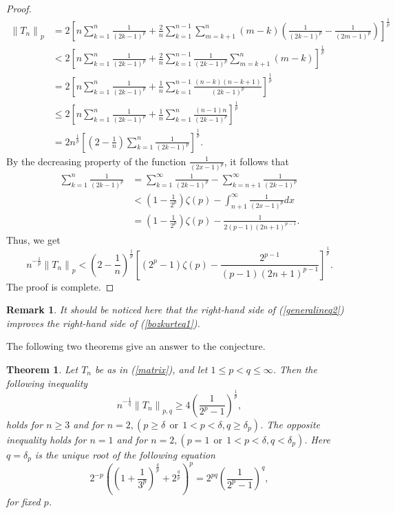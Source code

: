 \documentclass{amsart}
\newtheorem{theorem}{Theorem}
\newtheorem{remark}{Remark}
\begin{document}
\begin{proof}
\begin{align*}
\left\|T_n\right\|_p&=2\left[n\sum_{k=1}^n\frac{1}{(2k-1)^p}+\frac{2}{n}\sum_{k=1}^{n-1}\sum_{m=k+1}^{n}(m-k)\left(\frac{1}{(2k-1)^p}-\frac{1}{(2m-1)^p}\right)\right]^\frac{1}{p}\\
&< 2\left[n\sum_{k=1}^n\frac{1}{(2k-1)^p}+\frac{2}{n}\sum_{k=1}^{n-1}\frac{1}{(2k-1)^p}\sum_{m=k+1}^{n}(m-k)\right]^\frac{1}{p}\\
&= 2\left[n\sum_{k=1}^n\frac{1}{(2k-1)^p}+\frac{1}{n}\sum_{k=1}^{n-1}\frac{(n-k)(n-k+1)}{(2k-1)^p}\right]^\frac{1}{p}\\
&\leq 2\left[n\sum_{k=1}^n\frac{1}{(2k-1)^p}+\frac{1}{n}\sum_{k=1}^{n}\frac{(n-1)n}{(2k-1)^p}\right]^\frac{1}{p}\\
&= 2n^\frac{1}{p}\left[\left(2-\frac{1}{n}\right)\sum_{k=1}^n\frac{1}{(2k-1)^p}\right]^\frac{1}{p}.
\end{align*}
By the decreasing property of the function $\frac{1}{(2x-1)^p}$, it follows that
\begin{align*}
    \sum_{k=1}^n\frac{1}{(2k-1)^p}&=\sum_{k=1}^\infty\frac{1}{(2k-1)^p}-\sum_{k=n+1}^\infty\frac{1}{(2k-1)^p}\\
    &<\left(1-\frac{1}{2^p}\right)\zeta(p)-\int_{n+1}^\infty\frac{1}{(2x-1)^p}dx\\
    &=\left(1-\frac{1}{2^p}\right)\zeta(p)-\frac{1}{2(p-1)(2n+1)^{p-1}}.
\end{align*}
Thus, we get
$$n^{-\frac{1}{p}}\left\|T_n\right\|_p<\left(2-\frac{1}{n}\right)^{\frac{1}{p}}\left[(2^p-1)\zeta(p)-\frac{2^{p-1}}{(p-1)(2n+1)^{p-1}}\right]^\frac{1}{p}.$$
The proof is complete.
\end{proof}
\begin{remark}
It should be noticed here that the right-hand side of (\ref{generalineq2}) improves the right-hand side of (\ref{bozkurteq1}).
\end{remark}
The following two theorems give an answer to the conjecture.
\begin{theorem}\label{mainthm1}
Let $T_n$ be as in (\ref{matrix}), and let $1\leq p<q\leq\infty$. Then the following inequality
\begin{equation}\label{mainthmeq1}
n^{-\frac{1}{q}}\left\|T_{n}\right\|_{p,q}\geq 4\left(\frac{1}{2^{p}-1}\right)^{\frac{1}{p}}, 
\end{equation}
holds for $n\geq3$ and for $n=2, (p\geq\delta~~\text{or}~~1<p<\delta, q\geq \delta_p)$. The opposite inequality holds for $n=1$ and for $n=2, (p=1~~\text{or}~~1< p<\delta, q<\delta_p )$. Here $q=\delta_p$ is the unique root of the following equation
\begin{equation}\label{delta}
2^{-p}\left(\left(1+\frac{1}{3^p}\right)^\frac{q}{p}+2^\frac{q}{p}\right)^p=2^{pq}\left(\frac{1}{2^p-1}\right)^q,
\end{equation}
for fixed $p$. 
\end{theorem}
\end{document}
